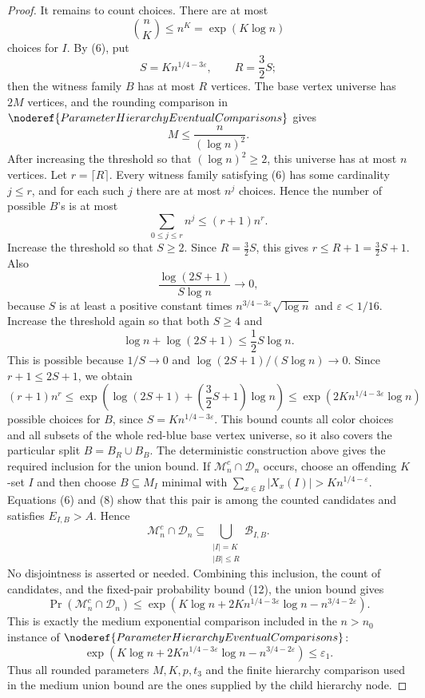 \begin{proof}
It remains to count choices.  There are at most
\[
\binom{n}{K}\le n^K=\exp(K\log n)
\]
choices for \(I\).  By (6), put
\[
S=K n^{1/4-3\varepsilon},
\qquad
R=\frac32S;
\]
then the witness family \(B\) has at most \(R\) vertices.  The base vertex
universe has \(2M\) vertices, and the rounding comparison in
\(\noderef{ParameterHierarchyEventualComparisons}\) gives
\[
M\le \frac{n}{(\log n)^2}.
\]
After increasing the threshold so that \((\log n)^2\ge2\), this universe has
at most \(n\) vertices.  Let \(r=\lceil R\rceil\).  Every witness family
satisfying (6) has some cardinality \(j\le r\), and for each such \(j\) there
are at most \(n^j\) choices.  Hence the number of possible \(B\)'s is at most
\[
\sum_{0\le j\le r} n^j\le (r+1)n^r.
\]
Increase the threshold so that \(S\ge2\).  Since \(R=\frac32S\), this gives
\(r\le R+1=\frac32S+1\).  Also
\[
\frac{\log(2S+1)}{S\log n}\to0,
\]
because \(S\) is at least a positive constant times
\(n^{3/4-3\varepsilon}\sqrt{\log n}\) and \(\varepsilon<1/16\).  Increase the
threshold again so that both \(S\ge4\) and
\[
\log n+\log(2S+1)\le\frac12S\log n.
\]
This is possible because \(1/S\to0\) and
\(\log(2S+1)/(S\log n)\to0\).  Since \(r+1\le2S+1\), we obtain
\[
(r+1)n^r
\le
\exp\!\left(\log(2S+1)+\left(\frac32S+1\right)\log n\right)
\le \exp\!\left(2K n^{1/4-3\varepsilon}\log n\right)
\]
possible choices for \(B\), since \(S=K n^{1/4-3\varepsilon}\).  This bound
counts all color choices and all subsets of the whole red-blue base vertex
universe, so it also covers the particular split \(B=B_R\cup B_B\).
The deterministic construction above gives the required inclusion for the
union bound.  If \(\mathcal M_n^c\cap\mathcal D_n\) occurs, choose an
offending \(K\)-set \(I\) and then choose \(B\subseteq M_I\) minimal with
\(\sum_{x\in B}|X_x(I)|>K n^{1/4-\varepsilon}\).  Equations (6) and (8) show
that this pair is among the counted candidates and satisfies
\(E_{I,B}>A\).  Hence
\[
\mathcal M_n^c\cap\mathcal D_n
\subseteq
\bigcup_{\substack{|I|=K\\ |B|\le R}}
\mathcal B_{I,B}.
\]
No disjointness is asserted or needed.  Combining this inclusion, the count of
candidates, and the fixed-pair probability bound (12), the union bound gives
\[
\Pr(\mathcal M_n^c\cap\mathcal D_n)
\le
\exp\!\left(
K\log n+2K n^{1/4-3\varepsilon}\log n
-n^{3/4-2\varepsilon}
\right). \tag{13}
\]
This is exactly the medium exponential comparison included in the
\(n>n_0\) instance of
\(\noderef{ParameterHierarchyEventualComparisons}\):
\[
\exp\!\left(
K\log n+2K n^{1/4-3\varepsilon}\log n
-n^{3/4-2\varepsilon}
\right)\le\varepsilon_1.
\]
Thus all rounded parameters \(M,K,p,t_3\) and the finite hierarchy comparison
used in the medium union bound are the ones supplied by the child hierarchy
node.


\end{proof}
